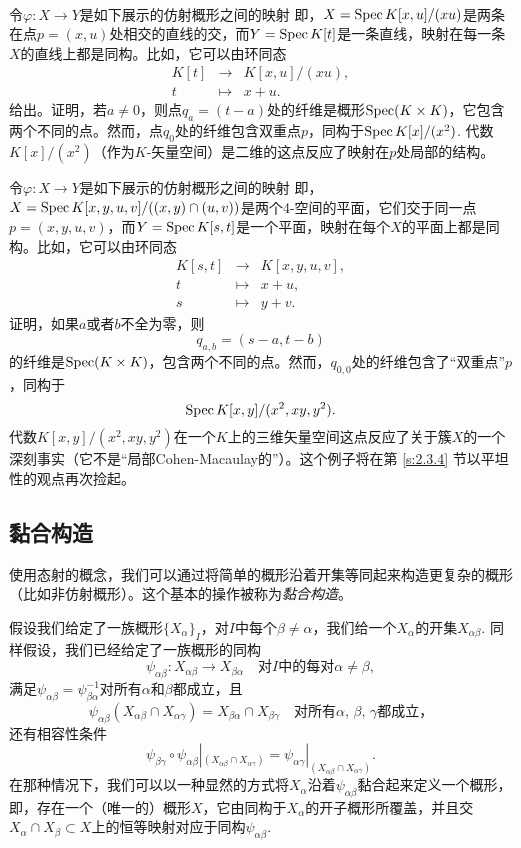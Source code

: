 \begin{exe}~\label{exe:1.43}
\begin{compactenum}[(a)]
\item 令$\varphi:X\to Y$是如下展示的仿射概形之间的映射
即，$X=\operatorname{Spec} K[x,u]/(xu)$是两条在点$p=(x,u)$处相交的直线的交，而$Y=\operatorname{Spec} K[t]$是一条直线，映射在每一条$X$的直线上都是同构。比如，它可以由环同态
\[
	\begin{array}{rcl}
	K[t]&\to &K[x,u]/(xu),\\
	t&\mapsto&x+u.
	\end{array}
\]
给出。证明，若$a\neq 0$，则点$q_a=(t-a)$处的纤维是概形$\operatorname{Spec}(K\times K)$，它包含两个不同的点。然而，点$q_0$处的纤维包含双重点$p$，同构于$\operatorname{Spec} K[x]/(x^2)$. 代数$K[x]/(x^2)$（作为$K$-矢量空间）是二维的这点反应了映射在$p$处局部的结构。
\item 令$\varphi:X\to Y$是如下展示的仿射概形之间的映射
即，$X=\operatorname{Spec} K[x,y,u,v]/((x,y)\cap (u,v))$是两个4-空间的平面，它们交于同一点$p=(x,y,u,v)$，而$Y=\operatorname{Spec} K[s,t]$是一个平面，映射在每个$X$的平面上都是同构。比如，它可以由环同态
\[
	\begin{array}{rcl}
	K[s,t]&\to &K[x,y,u,v],\\
	t&\mapsto&x+u,\\
	s&\mapsto&y+v.
	\end{array}
\]
证明，如果$a$或者$b$不全为零，则
\[
	q_{a,b}=(s-a,t-b)
\]
的纤维是$\operatorname{Spec}(K\times K)$，包含两个不同的点。然而，$q_{0,0}$处的纤维包含了“双重点”$p$，同构于
\[
	\operatorname{Spec} K[x,y]/(x^2,xy,y^2).
\]
代数$K[x,y]/(x^2,xy,y^2)$在一个$K$上的三维矢量空间这点反应了关于簇$X$的一个深刻事实（它不是“局部Cohen-Macaulay的”）。这个例子将在第 \ref{s:2.3.4} 节以平坦性的观点再次捡起。
\end{compactenum}
\end{exe}

\subsection{黏合构造} \label{s:1.2.4}

使用态射的概念，我们可以通过将简单的概形沿着开集等同起来构造更复杂的概形（比如非仿射概形）。这个基本的操作被称为\textit{黏合构造}。

假设我们给定了一族概形$\{X_\alpha\}_I$，对$I$中每个$\beta\neq \alpha$，我们给一个$X_\alpha$的开集$X_{\alpha\beta}$. 同样假设，我们已经给定了一族概形的同构
\[
	\psi_{\alpha\beta}:X_{\alpha\beta}\to X_{\beta\alpha}\quad \text{对$I$中的每对$\alpha\neq \beta$},
\]
满足$\psi_{\alpha\beta}=\psi_{\beta\alpha}^{-1}$对所有$\alpha$和$\beta$都成立，且
\[
	\psi_{\alpha\beta}(X_{\alpha\beta}\cap X_{\alpha\gamma})=X_{\beta\alpha}\cap X_{\beta\gamma}\quad \text{对所有$\alpha$, $\beta$, $\gamma$都成立，}
\]
还有相容性条件
\[
	\psi_{\beta\gamma}\circ \psi_{\alpha\beta}|_{(X_{\alpha\beta}\cap X_{\alpha\gamma})}=\psi_{\alpha\gamma}|_{(X_{\alpha\beta}\cap X_{\alpha\gamma})}.
\]
在那种情况下，我们可以以一种显然的方式将$X_\alpha$沿着$\psi_{\alpha\beta}$黏合起来定义一个概形，即，存在一个（唯一的）概形$X$，它由同构于$X_\alpha$的开子概形所覆盖，并且交$X_\alpha\cap X_\beta\subset X$上的恒等映射对应于同构$\psi_{\alpha\beta}$.

